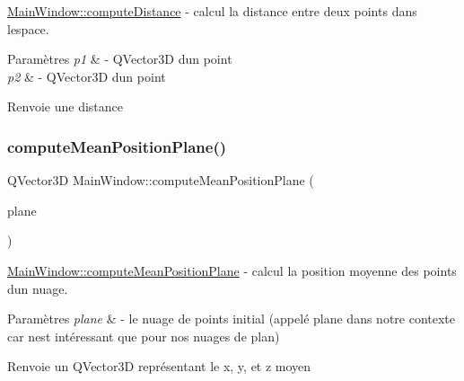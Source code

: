 \hyperlink{classMainWindow_a5cf7c81626d682f087f5143605342f52}{Main\+Window\+::compute\+Distance} -\/ calcul la distance entre deux points dans l\textquotesingle{}espace. 


\begin{DoxyParams}{Paramètres}
{\em p1} & -\/ Q\+Vector3D d\textquotesingle{}un point \\
\hline
{\em p2} & -\/ Q\+Vector3D d\textquotesingle{}un point \\
\hline
\end{DoxyParams}
\begin{DoxyReturn}{Renvoie}
une distance 
\end{DoxyReturn}
\mbox{\label{classMainWindow_a4cc8d1511438ac06d0e6c663c7fa3ab7}} 
\subsubsection{\texorpdfstring{compute\+Mean\+Position\+Plane()}{computeMeanPositionPlane()}}
{\footnotesize\ttfamily Q\+Vector3D Main\+Window\+::compute\+Mean\+Position\+Plane (\begin{DoxyParamCaption}\item[{pcl\+::\+Point\+Cloud$<$ pcl\+::\+Point\+X\+YZ $>$\+::Ptr}]{plane }\end{DoxyParamCaption})}



\hyperlink{classMainWindow_a4cc8d1511438ac06d0e6c663c7fa3ab7}{Main\+Window\+::compute\+Mean\+Position\+Plane} -\/ calcul la position moyenne des points d\textquotesingle{}un nuage. 


\begin{DoxyParams}{Paramètres}
{\em plane} & -\/ le nuage de points initial (appelé plane dans notre contexte car n\textquotesingle{}est intéressant que pour nos nuages de plan) \\
\hline
\end{DoxyParams}
\begin{DoxyReturn}{Renvoie}
un Q\+Vector3D représentant le x, y, et z moyen 
\end{DoxyReturn}
\mbox{\label{classMainWindow_a643a46cc48a4cbab47ebb6e2e9d05ca0}} 
